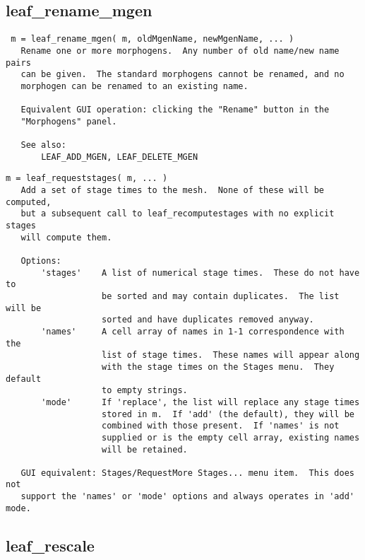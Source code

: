 \subsection{leaf\_rename\_mgen}\label{section-leaf-rename-mgen}

\begin{verbatim}
 m = leaf_rename_mgen( m, oldMgenName, newMgenName, ... )
   Rename one or more morphogens.  Any number of old name/new name pairs
   can be given.  The standard morphogens cannot be renamed, and no
   morphogen can be renamed to an existing name.

   Equivalent GUI operation: clicking the "Rename" button in the
   "Morphogens" panel.

   See also:
       LEAF_ADD_MGEN, LEAF_DELETE_MGEN
\end{verbatim}

\begin{verbatim}
m = leaf_requeststages( m, ... )
   Add a set of stage times to the mesh.  None of these will be computed,
   but a subsequent call to leaf_recomputestages with no explicit stages
   will compute them.

   Options:
       'stages'    A list of numerical stage times.  These do not have to
                   be sorted and may contain duplicates.  The list will be
                   sorted and have duplicates removed anyway.
       'names'     A cell array of names in 1-1 correspondence with the
                   list of stage times.  These names will appear along
                   with the stage times on the Stages menu.  They default
                   to empty strings.
       'mode'      If 'replace', the list will replace any stage times
                   stored in m.  If 'add' (the default), they will be
                   combined with those present.  If 'names' is not
                   supplied or is the empty cell array, existing names
                   will be retained.

   GUI equivalent: Stages/RequestMore Stages... menu item.  This does not
   support the 'names' or 'mode' options and always operates in 'add' mode.
\end{verbatim}

\subsection{leaf\_rescale}\label{section-leaf-rescale}

